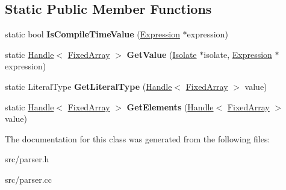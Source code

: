 \subsection*{Static Public Member Functions}
\begin{DoxyCompactItemize}
\item 
\hypertarget{classv8_1_1internal_1_1_compile_time_value_a42f388c360e1cdce36059fd5001ace81}{}static bool {\bfseries Is\+Compile\+Time\+Value} (\hyperlink{classv8_1_1internal_1_1_expression}{Expression} $\ast$expression)\label{classv8_1_1internal_1_1_compile_time_value_a42f388c360e1cdce36059fd5001ace81}

\item 
\hypertarget{classv8_1_1internal_1_1_compile_time_value_af62ef6f13fc7d3eff0f30e127357a283}{}static \hyperlink{classv8_1_1internal_1_1_handle}{Handle}$<$ \hyperlink{classv8_1_1internal_1_1_fixed_array}{Fixed\+Array} $>$ {\bfseries Get\+Value} (\hyperlink{classv8_1_1internal_1_1_isolate}{Isolate} $\ast$isolate, \hyperlink{classv8_1_1internal_1_1_expression}{Expression} $\ast$expression)\label{classv8_1_1internal_1_1_compile_time_value_af62ef6f13fc7d3eff0f30e127357a283}

\item 
\hypertarget{classv8_1_1internal_1_1_compile_time_value_a3316cc02e00bf91885f42a91e66b7dd8}{}static Literal\+Type {\bfseries Get\+Literal\+Type} (\hyperlink{classv8_1_1internal_1_1_handle}{Handle}$<$ \hyperlink{classv8_1_1internal_1_1_fixed_array}{Fixed\+Array} $>$ value)\label{classv8_1_1internal_1_1_compile_time_value_a3316cc02e00bf91885f42a91e66b7dd8}

\item 
\hypertarget{classv8_1_1internal_1_1_compile_time_value_a0593049ea35745c8f75de40ebd995888}{}static \hyperlink{classv8_1_1internal_1_1_handle}{Handle}$<$ \hyperlink{classv8_1_1internal_1_1_fixed_array}{Fixed\+Array} $>$ {\bfseries Get\+Elements} (\hyperlink{classv8_1_1internal_1_1_handle}{Handle}$<$ \hyperlink{classv8_1_1internal_1_1_fixed_array}{Fixed\+Array} $>$ value)\label{classv8_1_1internal_1_1_compile_time_value_a0593049ea35745c8f75de40ebd995888}

\end{DoxyCompactItemize}


The documentation for this class was generated from the following files\+:\begin{DoxyCompactItemize}
\item 
src/parser.\+h\item 
src/parser.\+cc\end{DoxyCompactItemize}
